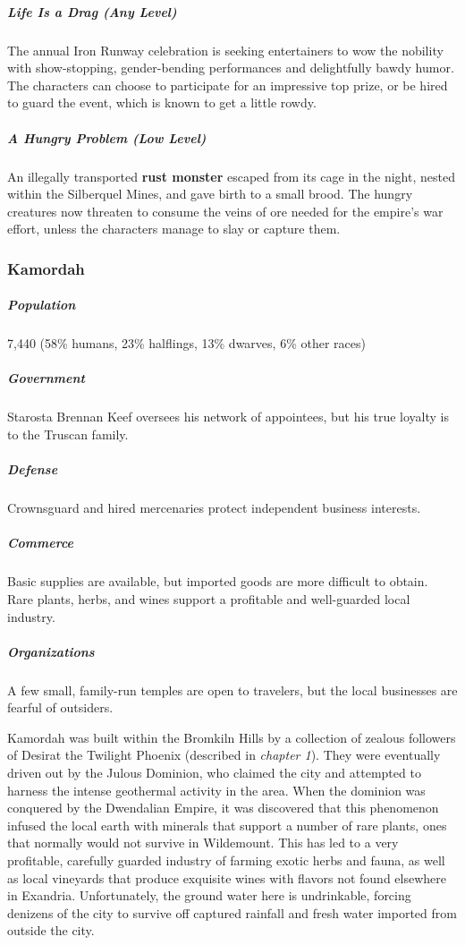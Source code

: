 \documentclass[10pt,a4paper,twoside,bg=print,twocolumn,openany,nodeprecatedcode]{dndbook}
\begin{document}
\subparagraph{Life Is a Drag (Any Level)}
The annual Iron Runway celebration is seeking entertainers to wow the nobility with show-stopping, gender-bending performances and delightfully bawdy humor. The characters can choose to participate for an impressive top prize, or be hired to guard the event, which is known to get a little rowdy.

\subparagraph{A Hungry Problem (Low Level)}
An illegally transported \textbf{rust monster} escaped from its cage in the night, nested within the Silberquel Mines, and gave birth to a small brood. The hungry creatures now threaten to consume the veins of ore needed for the empire's war effort, unless the characters manage to slay or capture them.

\subsubsection{Kamordah}
\subparagraph{Population}
7,440 (58\% humans, 23\% halflings, 13\% dwarves, 6\% other races)

\subparagraph{Government}
Starosta Brennan Keef oversees his network of appointees, but his true loyalty is to the Truscan family.

\subparagraph{Defense}
Crownsguard and hired mercenaries protect independent business interests.

\subparagraph{Commerce}
Basic supplies are available, but imported goods are more difficult to obtain. Rare plants, herbs, and wines support a profitable and well-guarded local industry.

\subparagraph{Organizations}
A few small, family-run temples are open to travelers, but the local businesses are fearful of outsiders.

Kamordah was built within the Bromkiln Hills by a collection of zealous followers of Desirat the Twilight Phoenix (described in \textit{chapter 1}). They were eventually driven out by the Julous Dominion, who claimed the city and attempted to harness the intense geothermal activity in the area. When the dominion was conquered by the Dwendalian Empire, it was discovered that this phenomenon infused the local earth with minerals that support a number of rare plants, ones that normally would not survive in Wildemount. This has led to a very profitable, carefully guarded industry of farming exotic herbs and fauna, as well as local vineyards that produce exquisite wines with flavors not found elsewhere in Exandria. Unfortunately, the ground water here is undrinkable, forcing denizens of the city to survive off captured rainfall and fresh water imported from outside the city.
\end{document}
